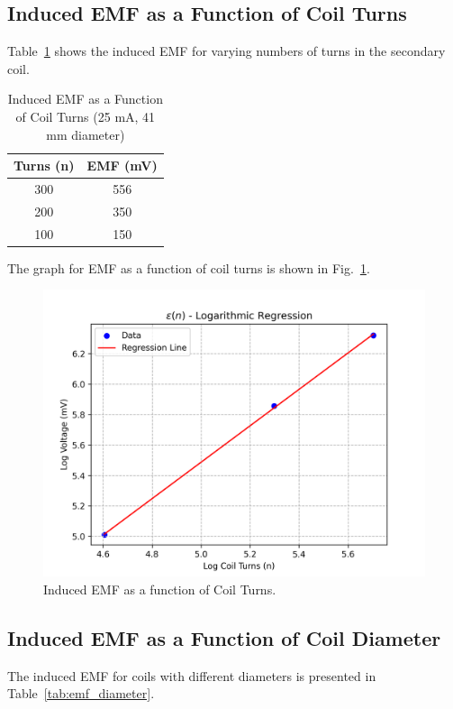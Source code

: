 \documentclass[journal]{IEEEtran}
\begin{document}
\subsection{Induced EMF as a Function of Coil Turns}
Table~\ref{tab:emf_turns} shows the induced EMF for varying numbers of turns in the secondary coil.

\begin{table}[H]
    \centering
    \caption{Induced EMF as a Function of Coil Turns (25 mA, 41 mm diameter)}
    \begin{tabular}{cc}
        \hline
        Turns (n) & EMF (mV) \\ \hline
        300 & 556 \\
        200 & 350 \\ 
        100 & 150 \\\hline
    \end{tabular}
    \label{tab:emf_turns}
\end{table}

The graph for EMF as a function of coil turns is shown in Fig.~\ref{fig:epsilon_turns}.

\begin{figure}[H]
    \centering
    \includegraphics[width=0.9\linewidth]{output_plots/epsilonN.png}
    \caption{Induced EMF as a function of Coil Turns.}
    \label{fig:epsilon_turns}
\end{figure}

\subsection{Induced EMF as a Function of Coil Diameter}
The induced EMF for coils with different diameters is presented in Table~\ref{tab:emf_diameter}.
\end{document}

